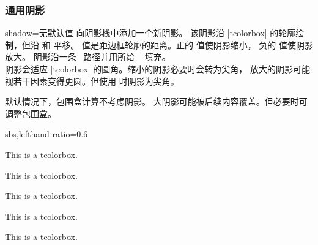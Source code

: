 \subsubsection{通用阴影}
\begin{docTcbKey}{shadow}{=}{无默认值}
  向阴影栈中添加一个新阴影。
  该阴影沿 |tcolorbox| 的轮廓绘制，但沿  和  平移。
   值是距边框轮廓的距离。正的  值使阴影缩小，
  负的  值使阴影放大。
  阴影沿一条 \tikzname\ 路径并用所给 \tikzname\  填充。\\
  阴影会适应 |tcolorbox| 的圆角。缩小的阴影必要时会转为尖角，
  放大的阴影可能视若干因素变得更圆。但使用 
  时阴影为尖角。
  \begin{marker}
  默认情况下，包围盒计算不考虑阴影。
  大阴影可能被后续内容覆盖。但必要时可调整包围盒。
  \end{marker}

\begin{dispExample*}{sbs,lefthand ratio=0.6}

\begin{tcolorbox}[title=My own shadow,
  shadow={2mm}{-1mm}{0mm}{black!50!white}]
This is a tcolorbox.
\end{tcolorbox}
\par\bigskip
\begin{tcolorbox}[title=Another shadow,
  shadow={-1mm}{-2mm}{0mm}{fill=blue,
    opacity=0.5}]
This is a tcolorbox.
\end{tcolorbox}
\par\bigskip
\begin{tcolorbox}[title=Double shadow,
  shadow={-1.5mm}{-1.5mm}{0mm}{fill=blue,
    opacity=0.25},
  shadow={1.5mm}{-1.5mm}{0mm}{fill=red,
    opacity=0.25}]
This is a tcolorbox.
\end{tcolorbox}
\par\bigskip
\begin{tcolorbox}[title=Far shadow,
  shadow={5.5mm}{-3.5mm}{2mm}{fill=black,
    opacity=0.25}]
This is a tcolorbox.
\end{tcolorbox}
\par\bigskip\bigskip
\begin{tcolorbox}[title=Halo shadow,
  shadow={0mm}{0mm}{-1.5mm}%
     {fill=yellow!75!red,opacity=0.5}]
This is a tcolorbox.
\end{tcolorbox}
\end{dispExample*}
\end{docTcbKey}

